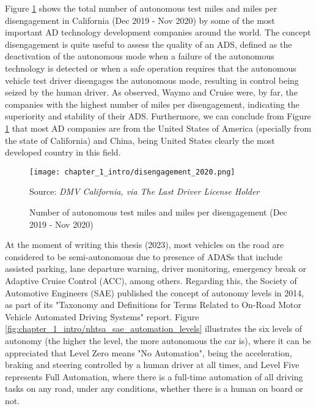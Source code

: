 Figure \ref{fig:chapter_1_intro/disengagement_2020} shows the total number of autonomous test miles and miles per disengagement in California (Dec 2019 - Nov 2020) by some of the most important \ac{AD} technology development companies around the world. The concept disengagement is quite useful to assess the quality of an \ac{ADS}, defined as the deactivation of the autonomous mode when a failure of the autonomous technology is detected or when a safe operation requires that the autonomous vehicle test driver disengages the autonomous mode, resulting in control being seized by the human driver. As observed, Waymo and Cruise were, by far, the companies with the highest number of miles per disengagement, indicating the superiority and stability of their \ac{ADS}. Furthermore, we can conclude from Figure \ref{fig:chapter_1_intro/disengagement_2020} that most \ac{AD} companies are from the United States of America (specially from the state of California) and China, being United States clearly the most developed country in this field.  

\begin{figure}[ht]
	\centering
	\texttt{[image: chapter\_1\_intro/disengagement\_2020.png]}
	\caption{Number of autonomous test miles and miles per disengagement (Dec 2019 - Nov 2020)}
	Source: \textit{DMV California, via The Last Driver License Holder}
	\label{fig:chapter_1_intro/disengagement_2020}
\end{figure}

At the moment of writing this thesis (2023), most vehicles on the road are considered to be semi-autonomous due to presence of \acp{ADAS} that include assisted parking, lane departure warning, driver monitoring, emergency break or Adaptive Cruise Control (ACC), among others. Regarding this, the Society of Automotive Engineers (SAE) published the concept of autonomy levels in 2014, as part of its "Taxonomy and Definitions for Terms Related to On-Road Motor Vehicle Automated Driving Systems" \cite{taxonomy2016definitions} report. Figure \ref{fig:chapter_1_intro/nhtsa_sae_automation_levels} illustrates the six levels of autonomy (the higher the level, the more autonomous the car is), where it can be appreciated that Level Zero means "No Automation", being the acceleration, braking and steering controlled by a human driver at all times, and Level Five represents Full Automation, where there is a full-time automation of all driving tasks on any road, under any conditions, whether there is a human on board or not.

